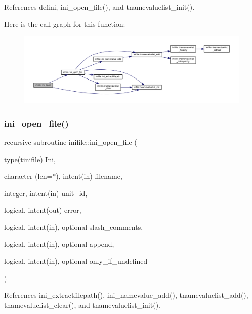 References defini, ini\+\_\+open\+\_\+file(), and tnamevaluelist\+\_\+init().

Here is the call graph for this function\+:
\nopagebreak
\begin{figure}[H]
\begin{center}
\leavevmode
\includegraphics[width=350pt]{namespaceinifile_a02e6bd0abca420cf13df98658ac047ba_cgraph}
\end{center}
\end{figure}
\mbox{\label{namespaceinifile_a18f4ff3cc821f6e027b4aefa829f4b41}} 
\subsubsection{\texorpdfstring{ini\+\_\+open\+\_\+file()}{ini\_open\_file()}}
{\footnotesize\ttfamily recursive subroutine inifile\+::ini\+\_\+open\+\_\+file (\begin{DoxyParamCaption}\item[{type(\mbox{\hyperlink{structinifile_1_1tinifile}{tinifile}})}]{Ini,  }\item[{character (len=$\ast$), intent(in)}]{filename,  }\item[{integer, intent(in)}]{unit\+\_\+id,  }\item[{logical, intent(out)}]{error,  }\item[{logical, intent(in), optional}]{slash\+\_\+comments,  }\item[{logical, intent(in), optional}]{append,  }\item[{logical, intent(in), optional}]{only\+\_\+if\+\_\+undefined }\end{DoxyParamCaption})}



References ini\+\_\+extractfilepath(), ini\+\_\+namevalue\+\_\+add(), tnamevaluelist\+\_\+add(), tnamevaluelist\+\_\+clear(), and tnamevaluelist\+\_\+init().



